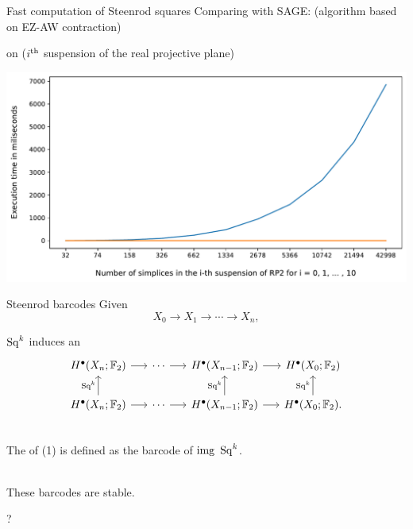\begin{frame}{Fast computation of Steenrod squares}
	\pause
	Comparing with SAGE: (algorithm based on EZ-AW contraction)

	\smallskip\pause
	 on  ($i^{\mathrm{th}}$ suspension of the real projective plane)

	\medskip
	\includegraphics[width=\textwidth]{aux/comp_sus_rp2.pdf}
\end{frame}

\begin{frame}[fragile]{Steenrod barcodes}
	\pause
	Given
	\begin{equation}\label{eq:filtration}
		X_0 \to X_1 \to \cdots \to X_n,
	\end{equation}

	\pause\smallskip
	$\operatorname{Sq}^k$ induces an 
	\[
	\begin{tikzcd}[column sep = 15]
		H^\bullet(X_n; \Ftwo) \arrow[r] & \cdots \arrow[r] & H^\bullet(X_{n-1}; \Ftwo) \arrow[r] & H^\bullet(X_0; \Ftwo) \\
		H^\bullet(X_n; \Ftwo) \arrow[u, "\Sq^k"] \arrow[r] & \cdots \arrow[r] & H^\bullet(X_{n-1}; \Ftwo) \arrow[u, "\Sq^k"] \arrow[r] & H^\bullet(X_0; \Ftwo) \arrow[u, "\Sq^k"].
	\end{tikzcd}
	\]

	\pause
	 \\
	The  of (1) is defined as the barcode of $\mathrm{img}\ \operatorname{Sq}^k$.

	\pause\bigskip
	 \\
	These barcodes are stable.

	\pause\bigskip
	?
\end{frame}

